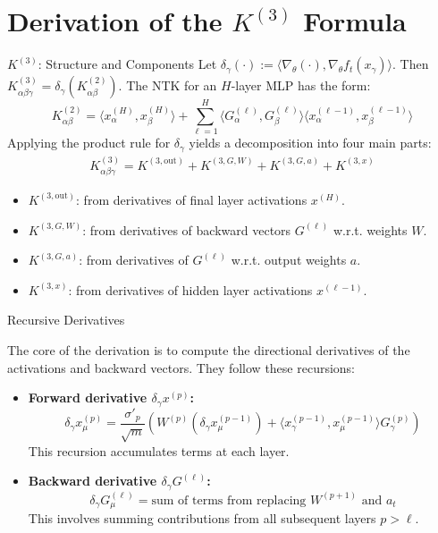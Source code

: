 \documentclass{beamer}
\begin{document}
\section{Derivation of the $K^{(3)}$ Formula}

\begin{frame}{$K^{(3)}$: Structure and Components}
Let $\delta_\gamma(\cdot) := \langle \nabla_\theta (\cdot), \nabla_\theta f_t(x_\gamma) \rangle$. Then $K^{(3)}_{\alpha\beta\gamma} = \delta_\gamma(K^{(2)}_{\alpha\beta})$.
\vspace{0.2cm}
The NTK for an $H$-layer MLP has the form:
\[
K^{(2)}_{\alpha\beta} = \langle x^{(H)}_\alpha, x^{(H)}_\beta \rangle + \sum_{\ell=1}^{H} \langle G^{(\ell)}_\alpha, G^{(\ell)}_\beta \rangle \langle x^{(\ell-1)}_\alpha, x^{(\ell-1)}_\beta \rangle
\]
Applying the product rule for $\delta_\gamma$ yields a decomposition into four main parts:
\begin{align*}
K^{(3)}_{\alpha\beta\gamma} = K^{(3,\text{out})} + K^{(3,G,W)} + K^{(3,G,a)} + K^{(3,x)}
\end{align*}
\begin{itemize}
    \item $K^{(3,\text{out})}$: from derivatives of final layer activations $x^{(H)}$.
    \item $K^{(3,G,W)}$: from derivatives of backward vectors $G^{(\ell)}$ w.r.t. weights $W$.
    \item $K^{(3,G,a)}$: from derivatives of $G^{(\ell)}$ w.r.t. output weights $a$.
    \item $K^{(3,x)}$: from derivatives of hidden layer activations $x^{(\ell-1)}$.
\end{itemize}
\end{frame}

\begin{frame}{Recursive Derivatives}
\begin{proposition}
The core of the derivation is to compute the directional derivatives of the activations and backward vectors. They follow these recursions:
\begin{itemize}
    \item \textbf{Forward derivative $\delta_\gamma x^{(p)}$:}
    \[
    \delta_\gamma x^{(p)}_\mu = \frac{\sigma'_{p}}{\sqrt{m}} \left( W^{(p)} (\delta_\gamma x^{(p-1)}_\mu) + \langle x^{(p-1)}_\gamma, x^{(p-1)}_\mu \rangle G^{(p)}_\gamma \right)
    \]
    This recursion accumulates terms at each layer.
    
    \item \textbf{Backward derivative $\delta_\gamma G^{(\ell)}$:}
    \[
    \delta_\gamma G^{(\ell)}_\mu = \text{sum of terms from replacing } W^{(p+1)} \text{ and } a_t
    \]
    This involves summing contributions from all subsequent layers $p > \ell$.
\end{itemize}
\end{proposition}
\end{frame}
\end{document}
